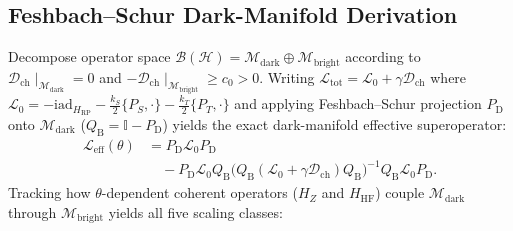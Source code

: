 \documentclass[twocolumn,10pt,amsmath,amssymb,floatfix]{revtex4-2}
\theoremstyle{plain}
\theoremstyle{definition}
\newcommand{\ii}{\mathrm{i}}
\newcommand{\PS}{P_S}
\newcommand{\PT}{P_T}
\newcommand{\HRP}{H_{\mathrm{RP}}}
\newcommand{\HZ}{H_Z}
\newcommand{\HHF}{H_{\mathrm{HF}}}
\begin{document}
\subsection{Feshbach--Schur Dark-Manifold Derivation}

Decompose operator space $\mathcal{B}(\mathcal{H}) = \mathcal{M}_{\mathrm{dark}} \oplus \mathcal{M}_{\mathrm{bright}}$ according to $\mathcal{D}_{\mathrm{ch}}\!\mid_{\mathcal{M}_{\mathrm{dark}}} = 0$ and $-\mathcal{D}_{\mathrm{ch}}\!\mid_{\mathcal{M}_{\mathrm{bright}}} \ge c_0 > 0$. Writing $\mathcal{L}_{\mathrm{tot}} = \mathcal{L}_0 + \gamma\mathcal{D}_{\mathrm{ch}}$ where $\mathcal{L}_0 = -\ii\mathrm{ad}_{\HRP} - \frac{k_S}{2}\{\PS,\cdot\} - \frac{k_T}{2}\{\PT,\cdot\}$ and applying Feshbach--Schur projection $P_{\mathrm{D}}$ onto $\mathcal{M}_{\mathrm{dark}}$ ($Q_{\mathrm{B}} = \mathbb{I}-P_{\mathrm{D}}$) yields the exact dark-manifold effective superoperator:
\begin{align}
\label{eq:Schur}
\mathcal{L}_{\mathrm{eff}}(\theta) &= P_{\mathrm{D}}\mathcal{L}_0 P_{\mathrm{D}} \nonumber\\
&\quad - P_{\mathrm{D}}\mathcal{L}_0 Q_{\mathrm{B}}\bigl(Q_{\mathrm{B}}(\mathcal{L}_0 + \gamma\mathcal{D}_{\mathrm{ch}})Q_{\mathrm{B}}\bigr)^{-1} Q_{\mathrm{B}}\mathcal{L}_0 P_{\mathrm{D}}.
\end{align}
Tracking how $\theta$-dependent coherent operators ($\HZ$ and $\HHF$) couple $\mathcal{M}_{\mathrm{dark}}$ through $\mathcal{M}_{\mathrm{bright}}$ yields all five scaling classes:
\end{document}
